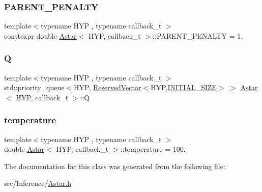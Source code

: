 \subsubsection{\texorpdfstring{P\+A\+R\+E\+N\+T\+\_\+\+P\+E\+N\+A\+L\+TY}{PARENT\_PENALTY}}
{\footnotesize\ttfamily template$<$typename H\+YP , typename callback\+\_\+t $>$ \\
constexpr double \hyperlink{class_astar}{Astar}$<$ H\+YP, callback\+\_\+t $>$\+::P\+A\+R\+E\+N\+T\+\_\+\+P\+E\+N\+A\+L\+TY = 1.\hspace{0.3cm}{\ttfamily [static]}}

\mbox{\label{class_astar_af96593236e2f3ea3d15b37d513308391}} 
\subsubsection{\texorpdfstring{Q}{Q}}
{\footnotesize\ttfamily template$<$typename H\+YP , typename callback\+\_\+t $>$ \\
std\+::priority\+\_\+queue$<$H\+YP, \hyperlink{class_reserved_vector}{Reserved\+Vector}$<$H\+YP,\hyperlink{class_astar_af674f24278326383c5972fc30f0b21d9}{I\+N\+I\+T\+I\+A\+L\+\_\+\+S\+I\+ZE}$>$ $>$ \hyperlink{class_astar}{Astar}$<$ H\+YP, callback\+\_\+t $>$\+::Q}

\mbox{\label{class_astar_a9c708491f187aca582d7a3499a442bba}} 
\subsubsection{\texorpdfstring{temperature}{temperature}}
{\footnotesize\ttfamily template$<$typename H\+YP , typename callback\+\_\+t $>$ \\
double \hyperlink{class_astar}{Astar}$<$ H\+YP, callback\+\_\+t $>$\+::temperature = 100.\hspace{0.3cm}{\ttfamily [static]}}



The documentation for this class was generated from the following file\+:\begin{DoxyCompactItemize}
\item 
src/\+Inference/\hyperlink{_astar_8h}{Astar.\+h}\end{DoxyCompactItemize}
